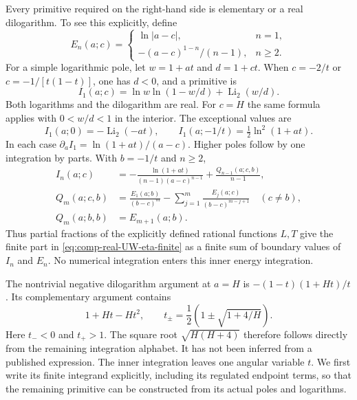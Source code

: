 Every primitive required on the right-hand side is elementary or
a real dilogarithm. To see this explicitly, define
\begin{equation}
 E_n(a;c)=\begin{cases}
 \ln|a-c|,&n=1,\\
 -(a-c)^{1-n}/(n-1),&n\geq2.
 \end{cases}
\end{equation}
For a simple logarithmic pole, let $w=1+at$ and $d=1+ct$.
When $c=-2/t$ or $c=-1/[t(1-t)]$, one has $d<0$, and a primitive is
\begin{equation}
 I_1(a;c)=\ln w\ln(1-w/d)+\operatorname{Li}_2(w/d).
\end{equation}
Both logarithms and the dilogarithm are real. For $c=H$ the same
formula applies with $0<w/d<1$ in the interior. The exceptional
values are
\begin{equation}
 I_1(a;0)=-\operatorname{Li}_2(-at),\qquad
 I_1(a;-1/t)=\tfrac12\ln^2(1+at).
\end{equation}
In each case $\partial_a I_1=\ln(1+at)/(a-c)$.
Higher poles follow by one integration by parts. With $b=-1/t$
and $n\geq2$,
\begin{align}
 I_n(a;c)&=-\frac{\ln(1+at)}{(n-1)(a-c)^{n-1}}
                  +\frac{Q_{n-1}(a;c,b)}{n-1},\\
 Q_m(a;c,b)&=\frac{E_1(a;b)}{(b-c)^m}
            -\sum_{j=1}^m\frac{E_j(a;c)}{(b-c)^{m-j+1}}
                         \quad(c\ne b),\\
 Q_m(a;b,b)&=E_{m+1}(a;b).
\end{align}
Thus partial fractions of the explicitly defined rational functions
$L,T$ give the finite part in
\eqref{eq:comp-real-UW-eta-finite} as a finite sum of boundary values
of $I_n$ and $E_n$. No numerical integration enters this inner
energy integration.

The nontrivial negative dilogarithm argument at $a=H$ is
$-(1-t)(1+Ht)/t$. Its complementary argument contains
\begin{equation}
 1+Ht-Ht^2,
 \qquad t_\pm=\frac12\left(1\pm\sqrt{1+4/H}\right).
\end{equation}
Here $t_-<0$ and $t_+>1$. The square root $\sqrt{H(H+4)}$
therefore follows directly from the remaining integration alphabet.
It has not been inferred from a published expression.
The inner integration leaves one angular variable $t$. We first
write its finite integrand explicitly, including its regulated
endpoint terms, so that the remaining primitive can be constructed
from its actual poles and logarithms.

